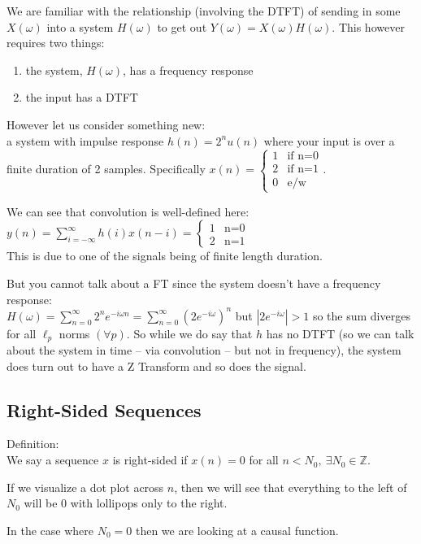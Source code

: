We are familiar with the relationship (involving the DTFT) of sending in some $X(\omega)$ into a system $H(\omega)$ to get out $Y(\omega)=X(\omega)H(\omega)$. This however requires two things:
\begin{enumerate}
    \item the system, $H(\omega)$, has a frequency response
    \item the input has a DTFT
\end{enumerate}

However let us consider something new:\\
a system with impulse response $h(n)=2^n u(n)$ where your input is over a finite duration of 2 samples. Specifically $x(n)=\begin{cases}1 &\text{if n=0} \\ 2 &\text{if n=1} \\ 0 &\text{e/w} \end{cases}$.

We can see that convolution is well-defined here: $y(n)=\sum_{i=-\infty}^\infty h(i)x(n-i)=\begin{cases}1 &\text{n=0} \\ 2 &\text{n=1} \end{cases}$ \\
This is due to one of the signals being of finite length duration.

But you cannot talk about a FT since the system doesn't have a frequency response: \\
$H(\omega)=\sum_{n=0}^\infty 2^n e^{-i\omega n} =\sum_{n=0}^\infty (2 e^{-i\omega})^n$ but $|2 e^{-i\omega}|>1$ so the sum diverges for all $\ell_p$ norms $(\forall p)$. 
So while we do say that $h$ has no DTFT (so we can talk about the system in time -- via convolution -- but not in frequency), the system does turn out to have a Z Transform and so does the signal.

\subsection{Right-Sided Sequences}
\begin{shaded}
Definition:\\
We say a sequence $x$ is right-sided if $x(n)=0$ for all $n < N_0,\ \exists N_0 \in \mathbb Z$.
\end{shaded}
If we visualize a dot plot across $n$, then we will see that everything to the left of $N_0$ will be $0$ with lollipops only to the right.

In the case where $N_0=0$ then we are looking at a causal function.

